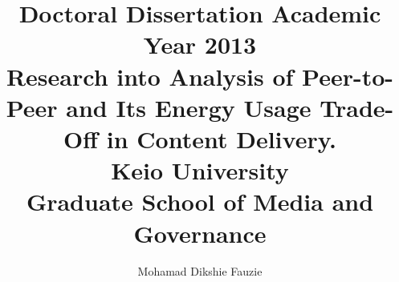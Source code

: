 \title{Doctoral Dissertation Academic Year 2013\\
\vspace{5cm}
Research into Analysis of Peer-to-Peer and Its Energy Usage Trade-Off in Content Delivery. \\
\vspace{5cm}
Keio University \\
Graduate School of Media and Governance}
\author{Mohamad Dikshie Fauzie}
\date{}
\maketitle
